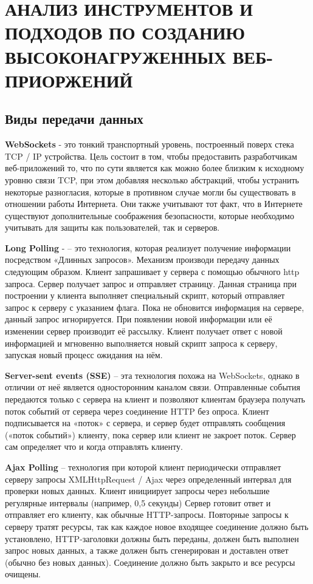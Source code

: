 \chapter{АНАЛИЗ ИНСТРУМЕНТОВ И ПОДХОДОВ ПО СОЗДАНИЮ ВЫСОКОНАГРУЖЕННЫХ ВЕБ-ПРИОРЖЕНИЙ} \label{ch2}
	
\section{Виды передачи данных} \label{ch2:title-abbr} 

\textbf{WebSockets} - это тонкий транспортный уровень, построенный поверх стека TCP / IP устройства. Цель состоит в том, чтобы предоставить разработчикам веб-приложений то, что по сути является как можно более близким к исходному уровню связи TCP, при этом добавляя несколько абстракций, чтобы устранить некоторые разногласия, которые в противном случае могли бы существовать в отношении работы Интернета. Они также учитывают тот факт, что в Интернете существуют дополнительные соображения безопасности, которые необходимо учитывать для защиты как пользователей, так и серверов.

\textbf{Long Polling} - – это технология, которая реализует получение информации посредством «Длинных запросов». Механизм производи передачу данных следующим образом. Клиент запрашивает у сервера с помощью обычного http запроса. Сервер получает запрос и отправляет страницу. Данная страница при построении у клиента выполняет специальный скрипт, который отправляет запрос к серверу с указанием флага. Пока не обновится информация на сервере, данный запрос игнорируется. При появлении новой информации или её изменении сервер производит её рассылку. Клиент получает ответ с новой информацией и мгновенно выполняется новый скрипт запроса к серверу, запуская новый процесс ожидания на нём.

\textbf{Server-sent events (SSE)} – эта технология похожа на WebSockets, однако в отличии от неё является односторонним каналом связи. Отправленные события передаются только с сервера на клиент и позволяют клиентам браузера получать поток событий от сервера через соединение HTTP без опроса. Клиент подписывается на «поток» с сервера, и сервер будет отправлять сообщения («поток событий») клиенту, пока сервер или клиент не закроет поток. Сервер сам определяет что и когда отправлять клиенту.

\textbf{Ajax Polling} – технология при которой клиент периодически отправляет серверу запросы XMLHttpRequest / Ajax через определенный интервал для проверки новых данных. Клиент инициирует запросы через небольшие регулярные интервалы (например, 0,5 секунды) Сервер готовит ответ и отправляет его клиенту, как обычные HTTP-запросы. Повторные запросы к серверу тратят ресурсы, так как каждое новое входящее соединение должно быть установлено, HTTP-заголовки должны быть переданы, должен быть выполнен запрос новых данных, а также должен быть сгенерирован и доставлен ответ (обычно без новых данных). Соединение должно быть закрыто и все ресурсы очищены.

